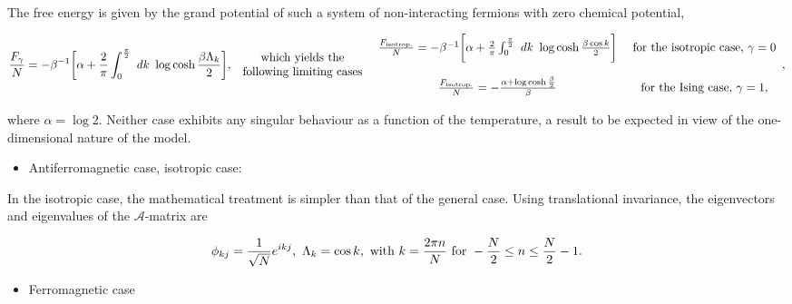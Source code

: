 \documentclass{homework}
\begin{document}
\blanky \\

The free energy is given by the grand potential of such a system of non-interacting fermions with zero chemical potential,

\begin{equation}
    \frac{F_{\gamma}}{N} = -\beta^{-1} \bigg[\alpha + \frac{2}{\pi} \int_{0}^{\frac{\pi}{2}}\ dk \textnormal{ } \log \cosh \frac{\beta \Lambda_k}{2} \bigg], \begin{array}{cc}
         \textnormal{ which yields the  }  \\
         \textnormal{ following limiting cases }
    \end{array} \begin{array}{cc}
      \frac{F_{\textnormal{isotrop.}}}{N} = -\beta^{-1} \bigg[\alpha + \frac{2}{\pi} \int_{0}^{\frac{\pi}{2}}\ dk \textnormal{ } \log \cosh \frac{\beta \cos k}{2} \bigg] & \textnormal{ for the isotropic case, } \gamma = 0\\ 
     \\
      \frac{F_{\textnormal{isotrop.}}}{N} = - \frac{\alpha + \log \cosh \frac{\beta}{2}}{\beta} & \textnormal{ for the Ising case, } \gamma = 1,
\end{array},
\end{equation}

where $\alpha = \log 2$. Neither case exhibits any singular behaviour as a function of the temperature, a result to be expected in view of the one-dimensional nature of the model. \\

\begin{itemize}
    \item Antiferromagnetic case, isotropic case:
\end{itemize}

In the isotropic case, the mathematical treatment is simpler than that of the general case. Using translational invariance, the eigenvectors and eigenvalues of the ${\mathcal{A}}$-matrix are 

\begin{equation}
    \phi_{kj} = \frac{1}{\sqrt{N}} e^{ikj}, \textnormal{ } \Lambda_k = \cos k, \textnormal{ with } k = \frac{2\pi n}{N} \textnormal{ for } -\frac{N}{2} \leq n \leq \frac{N}{2} - 1.
\end{equation}

\begin{itemize}
    \item Ferromagnetic case
\end{itemize}
\end{document}

